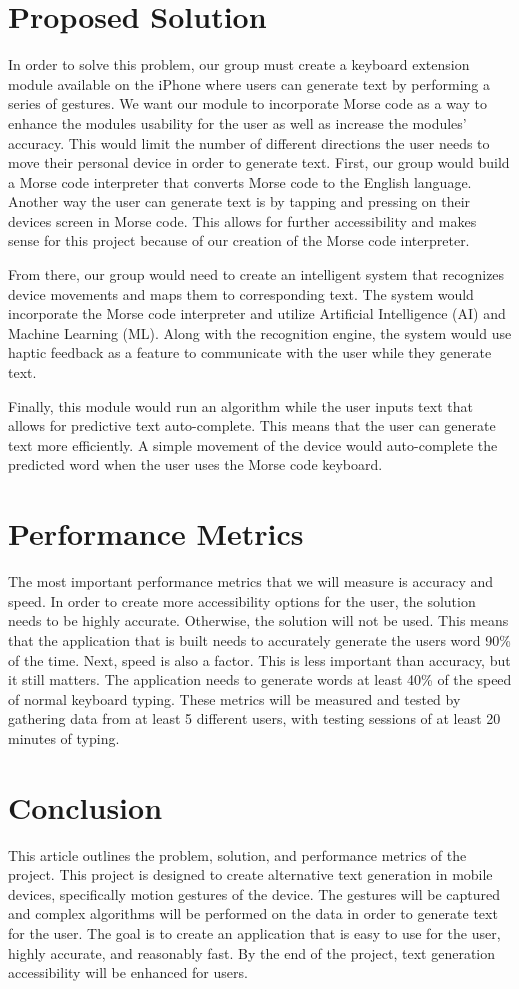 \documentclass[draftclsnofoot,onecolumn]{iEEEtran}
\begin{document}
\section{Proposed Solution}
\IEEEPARstart{}{}In order to solve this problem, our group must create a keyboard extension module available on the iPhone where users can generate text by performing a series of gestures. We want our module to incorporate Morse code as a way to enhance the modules usability for the user as well as increase the modules’ accuracy. This would limit the number of different directions the user needs to move their personal device in order to generate text. First, our group would build a Morse code interpreter that converts Morse code to the English language. Another way the user can generate text is by tapping and pressing on their devices screen in Morse code. This allows for further accessibility and makes sense for this project because of our creation of the Morse code interpreter. 

From there, our group would need to create an intelligent system that recognizes device movements and maps them to corresponding text. The system would incorporate the Morse code interpreter and utilize Artificial Intelligence (AI) and Machine Learning (ML). Along with the recognition engine, the system would use haptic feedback as a feature to communicate with the user while they generate text. 

Finally, this module would run an algorithm while the user inputs text that allows for predictive text auto-complete. This means that the user can generate text more efficiently. A simple movement of the device would auto-complete the predicted word when the user uses the Morse code keyboard.
\section{Performance Metrics}
\IEEEPARstart{}{}The most important performance metrics that we will measure is accuracy and speed. In order to create more accessibility options for the user, the solution needs to be highly accurate. Otherwise, the solution will not be used. This means that the application that is built needs to accurately generate the users word 90\% of the time. Next, speed is also a factor. This is less important than accuracy, but it still matters. The application needs to generate words at least 40\% of the speed of normal keyboard typing. These metrics will be measured and tested by gathering data from at least 5 different users, with testing sessions of at least 20 minutes of typing.
\section{Conclusion}
\IEEEPARstart{}{}This article outlines the problem, solution, and performance metrics of the project. This project is designed to create alternative text generation in mobile devices, specifically motion gestures of the device. The gestures will be captured and complex algorithms will be performed on the data in order to generate text for the user. The goal is to create an application that is easy to use for the user, highly accurate, and reasonably fast. By the end of the project, text generation accessibility will be enhanced for users. 
\end{document}

